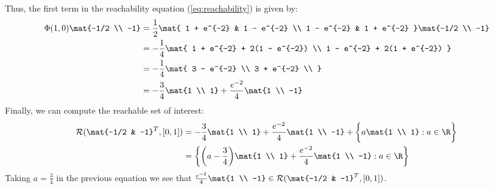 \documentclass{homework}
\begin{document}
\begin{letterenum}
Thus, the first term in the reachability equation (\ref{eq:reachability})
is given by:
\begin{align*}
    \Phi(1, 0) \mat{-1/2 \\ -1} &= \frac{1}{2} \mat{
        1 + e^{-2} & 1 - e^{-2} \\
        1 - e^{-2} & 1 + e^{-2}
    } \mat{-1/2 \\ -1} \\
    &= -\frac{1}{4} \mat{
        1 + e^{-2} + 2(1 - e^{-2}) \\
        1 - e^{-2} + 2(1 + e^{-2})
    } \\
    &= -\frac{1}{4} \mat{
        3 - e^{-2} \\
        3 + e^{-2} \\
    } \\
    &= -\frac{3}{4} \mat{1 \\ 1} + \frac{e^{-2}}{4} \mat{1 \\ -1}
\end{align*}
Finally, we can compute the reachable set of interest:
\begin{align*}
    \reach(\mat{-1/2 & -1}^T, [0, 1]) &= 
        -\frac{3}{4} \mat{1 \\ 1} + \frac{e^{-2}}{4} \mat{1 \\ -1}
            + \biggl\{a \mat{1 \\ 1}: a \in \R\biggr\} \\
        &= \biggl\{
            \biggl(a - \frac{3}{4}\biggr) \mat{1 \\ 1}
            + \frac{e^{-2}}{4} \mat{1 \\ -1}:
            a \in \R
        \biggr\}
\end{align*}
Taking $a = \frac{3}{4}$ in the previous equation we see that
$\frac{e^{-2}}{4} \mat{1 \\ -1} \in \reach(\mat{-1/2 & -1}^T, [0, 1])$.



\end{letterenum}
\end{document}
